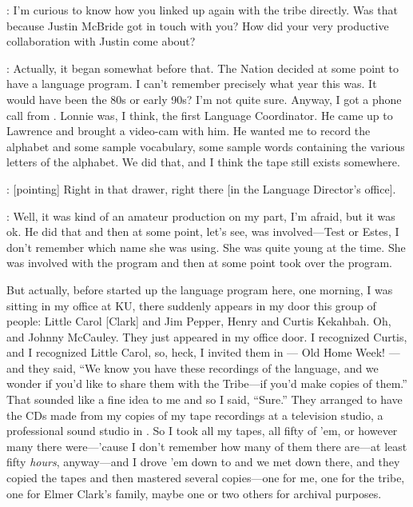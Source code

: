 \documentclass[output=paper]{LSP/langsci}
\begin{document}
: I'm curious to know how you linked up again with the  tribe directly. Was that because Justin McBride got in touch with you? How did your very productive collaboration with Justin come about?

: Actually, it began somewhat before that. The  Nation decided at some point to have a language program. I can't remember precisely what year this was. It would have been the 80s or early 90s? I'm not quite sure. Anyway, I got a phone call from . Lonnie was, I think, the first Language Coordinator. He came up to Lawrence and brought a video-cam with him. He wanted me to record the alphabet and some sample vocabulary, some sample words containing the various letters of the  alphabet. We did that, and I think the tape still exists somewhere.

: [pointing] Right in that drawer, right there [in the Language Director's office].

: Well, it was kind of an amateur production on my part, I'm afraid, but it was ok. He did that and then at some point, let's see,  was involved---Test or Estes, I don't remember which name she was using. She was quite young at the time. She was involved with the program and then at some point  took over the program. 

But actually, before  started up the language program here, one morning, I was sitting in my office at KU, there suddenly appears in my door this group of people: Little Carol [Clark] and Jim Pepper, Henry and Curtis Kekahbah. Oh, and Johnny McCauley. They just appeared in my office door. I recognized Curtis, and I recognized Little Carol, so, heck, I invited them in --- Old Home Week! --- and they said, ``We know you have these recordings of the  language, and we wonder if you'd like to share them with the Tribe---if you'd make copies of them.'' That sounded like a fine idea to me and so I said, ``Sure.'' They arranged to have the CDs made from my copies of my tape recordings at a television studio, a professional sound studio in . So I took all my tapes, all fifty of 'em, or however many there were---'cause I don't remember how many of them there are---at least fifty \textit{hours}, anyway---and I drove 'em down to  and we met down there, and they copied the tapes and then mastered several copies---one for me, one for the tribe, one for Elmer Clark's family, maybe one or two others for archival purposes. 
\end{document}

